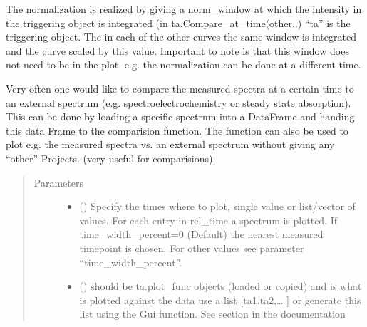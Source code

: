 \documentclass[letterpaper,10pt,english]{sphinxmanual}
\begin{document}
\begin{fulllineitems}
\begin{fulllineitems}
The normalization is realized by giving a norm\_window
at which the intensity in the triggering object is integrated (in ta.Compare\_at\_time(other..)
“ta” is the triggering object. The in each of the other curves the same window is
integrated and the curve scaled by this value. Important to note is that this window
does not need to be in the plot. e.g. the normalization can be done at a different time.

Very often one would like to compare the measured spectra at a certain
time to an external spectrum (e.g. spectro\sphinxhyphen{}electro\sphinxhyphen{}chemistry or steady
state absorption). This can be done by loading a specific spectrum into
a DataFrame and handing this data Frame to the comparision function. The
function can also be used to plot e.g. the measured spectra vs. an
external spectrum without giving any “other” Projects. (very useful for
comparisions).
\begin{quote}\begin{description}
\item[{Parameters}] \leavevmode\begin{itemize}
\item {} 
 (\sphinxstyleliteralemphasis{\sphinxupquote{ (}}\sphinxstyleliteralemphasis{\sphinxupquote{)}}) \textendash{} Specify the times where to plot, single value or list/vector of values.
For each entry in rel\_time a spectrum is plotted.
If time\_width\_percent=0 (Default) the nearest measured
timepoint is chosen. For other values see parameter “time\_width\_percent”.

\item {} 
 (\sphinxstyleliteralemphasis{\sphinxupquote{, }}) \textendash{} should be ta.plot\_func objects (loaded or copied) and is what
is plotted against the data use a list {[}ta1,ta2,… {]} or generate this
list using the Gui function. See section {\hyperref[\detokenize{Opening:opening-multiple-files}]{}} in
the documentation


\end{itemize}
\end{description}
\end{quote}
\end{fulllineitems}
\end{fulllineitems}
\end{document}
